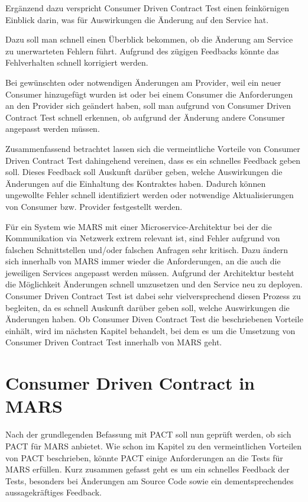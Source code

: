 \documentclass{llncs}
\begin{document}
Ergänzend dazu verspricht Consumer Driven Contract Test einen feinkörnigen Einblick darin, was für Auswirkungen die Änderung auf den Service hat.

Dazu soll man schnell einen Überblick bekommen, ob die Änderung am Service zu unerwarteten Fehlern führt. Aufgrund des zügigen Feedbacks könnte das Fehlverhalten schnell korrigiert werden.

Bei gewünschten oder notwendigen Änderungen am Provider, weil ein neuer Consumer hinzugefügt wurden ist oder bei einem Consumer die Anforderungen an den Provider sich geändert haben, soll man aufgrund von Consumer Driven Contract Test schnell erkennen, ob aufgrund der Änderung andere Consumer angepasst werden müssen. 

Zusammenfassend betrachtet lassen sich die vermeintliche Vorteile von Consumer Driven Contract Test dahingehend vereinen, dass es ein schnelles Feedback geben soll. Dieses Feedback soll Auskunft darüber geben, welche Auswirkungen die Änderungen auf die Einhaltung des Kontraktes haben. Dadurch können ungewollte Fehler schnell identifiziert werden oder notwendige Aktualisierungen von Consumer bzw. Provider festgestellt werden.

Für ein System wie MARS mit einer Microservice-Architektur bei der die Kommunikation via Netzwerk extrem relevant ist, sind Fehler aufgrund von falschen Schnittstellen und/oder falschen Anfragen sehr kritisch. Dazu ändern sich innerhalb von MARS immer wieder die Anforderungen, an die auch die jeweiligen Services angepasst werden müssen. Aufgrund der Architektur besteht die Möglichkeit Änderungen schnell umzusetzen und den Service neu zu deployen. Consumer Driven Contract Test ist dabei sehr vielversprechend diesen Prozess zu begleiten, da es schnell Auskunft darüber geben soll, welche Auswirkungen die Änderungen haben. Ob Consumer Diven Contract Test die beschriebenen Vorteile einhält, wird im nächsten Kapitel behandelt, bei dem es um die Umsetzung von Consumer Driven Contract Test innerhalb von MARS geht.

\section{Consumer Driven Contract in MARS}
Nach der grundlegenden Befassung mit PACT soll nun geprüft werden, ob sich PACT für MARS anbietet. Wie schon im Kapitel zu den vermeintlichen Vorteilen von PACT beschrieben, könnte PACT einige Anforderungen an die Tests für MARS erfüllen. Kurz zusammen gefasst geht es um ein schnelles Feedback der Tests, besonders bei Änderungen am Source Code sowie ein dementsprechendes aussagekräftiges Feedback.
\end{document}
